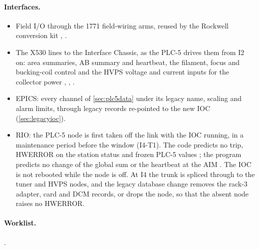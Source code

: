 \paragraph{Interfaces.}
\begin{itemize}
\item Field I/O through the 1771 field-wiring arms, reused by the Rockwell conversion
kit , .
\item The X530 lines to the Interface Chassis, as the PLC-5 drives them from I2 on:
area summaries, AB summary and heartbeat, the filament, focus and bucking-coil control
and the HVPS voltage and current inputs for the collector power , ,
.
\item EPICS: every channel of \cref{sec:plc5data} under its legacy name, scaling and
alarm limits, through legacy records re-pointed to the new IOC (\cref{sec:legacyioc}).
\item RIO: the PLC-5 node is first taken off the link with the IOC running, in a
maintenance period before the window (I4-T1). The code predicts no trip, HWERROR on the
station status and frozen PLC-5 values ; the program predicts no change of the
global sum or the heartbeat at the AIM . The IOC is not rebooted while the node is
off. At I4 the trunk is spliced through to the tuner and HVPS nodes, and the legacy
database change removes the rack-3 adapter, card and DCM records, or 
drops the node, so that the absent node raises no HWERROR.
\end{itemize}

\paragraph{Worklist.} .

